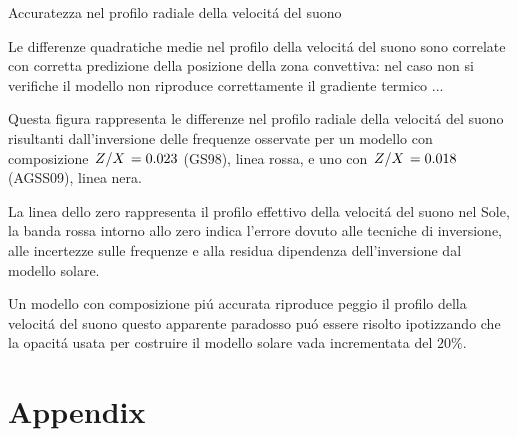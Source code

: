 \documentclass[10pt,xcolor={usenames},fleqn,mathserif,serif]{beamer}
\begin{document}
\begin{wordonframe}{Accuratezza nel profilo radiale della velocit\'a del suono}

Le differenze quadratiche medie nel profilo della velocit\'a del suono sono  correlate con corretta predizione della posizione della zona convettiva: nel caso non si verifiche il modello non riproduce correttamente il gradiente termico ...

Questa figura rappresenta le differenze nel profilo radiale della velocit\'a del suono risultanti dall'inversione delle frequenze osservate per un modello con composizione $\left.{Z}\middle/{X}\right.=0.023$ (GS98), linea rossa, e uno con $\left.{Z}\middle/{X}\right.=0.018$ (AGSS09), linea nera.

La linea dello zero rappresenta il profilo effettivo della velocit\'a del suono nel Sole, la banda rossa intorno allo zero indica l'errore dovuto alle tecniche di inversione, alle incertezze sulle frequenze e alla residua dipendenza dell'inversione dal modello solare.

Un modello con composizione pi\'u accurata riproduce peggio il profilo della velocit\'a del suono questo apparente paradosso pu\'o essere risolto ipotizzando che la opacit\'a usata per costruire il modello solare vada incrementata del $20\%$.

\end{wordonframe}

\section{Appendix}
\end{document}
